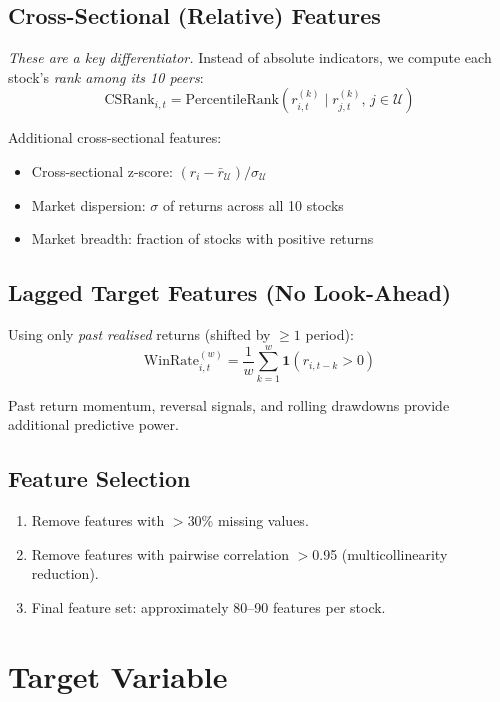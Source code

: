 \documentclass[12pt,a4paper]{article}
\begin{document}
\subsection{Cross-Sectional (Relative) Features}
\emph{These are a key differentiator.} Instead of absolute indicators, we compute each stock's \emph{rank among its 10 peers}:
\begin{equation}
    \text{CSRank}_{i,t} = \text{PercentileRank}(r_{i,t}^{(k)} \mid r_{j,t}^{(k)}, \, j \in \mathcal{U})
\end{equation}

Additional cross-sectional features:
\begin{itemize}
    \item Cross-sectional z-score: $(r_i - \bar{r}_{\mathcal{U}}) / \sigma_{\mathcal{U}}$
    \item Market dispersion: $\sigma$ of returns across all 10 stocks
    \item Market breadth: fraction of stocks with positive returns
\end{itemize}

\subsection{Lagged Target Features (No Look-Ahead)}
Using only \emph{past realised} returns (shifted by $\geq 1$ period):
\begin{equation}
    \text{WinRate}_{i,t}^{(w)} = \frac{1}{w}\sum_{k=1}^{w} \mathbf{1}(r_{i,t-k} > 0)
\end{equation}

Past return momentum, reversal signals, and rolling drawdowns provide additional predictive power.

\subsection{Feature Selection}
\begin{enumerate}
    \item Remove features with $>$30\% missing values.
    \item Remove features with pairwise correlation $>$0.95 (multicollinearity reduction).
    \item Final feature set: approximately 80--90 features per stock.
\end{enumerate}

\section{Target Variable}
\end{document}
